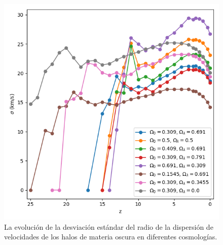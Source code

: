 \documentclass{beamer}
\begin{document}
\begin{frame}
\begin{columns}[t]
			\begin{column}{.5\textwidth}
				\begin{figure}
					\centering
					\includegraphics[scale=0.27]{Conc/VelDisp_Std_Conc.png}
					\caption{\footnotesize La evolución de la desviación estándar del radio de la dispersión de velocidades de los halos de materia oscura en diferentes cosmologías.}
					\label{fig:Conc-VelDispStd}
				\end{figure}
			\end{column}
		\end{columns}

	\end{frame}	





\end{document}
